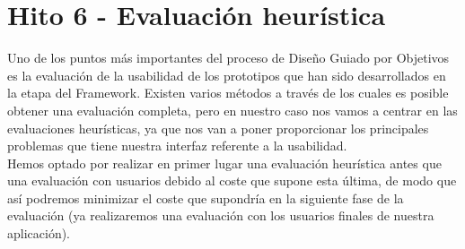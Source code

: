 \chapter{Hito 6 - Evaluación heurística}
Uno de los puntos más importantes del proceso de Diseño Guiado por Objetivos es la evaluación de la usabilidad de los
prototipos que han sido desarrollados en la etapa del Framework. Existen varios métodos a través de los cuales es posible
obtener una evaluación completa, pero en nuestro caso nos vamos a centrar en las evaluaciones heurísticas, ya que nos van a poner
proporcionar los principales problemas que tiene nuestra interfaz referente a la usabilidad. \\

Hemos optado por realizar en primer lugar una evaluación heurística antes que una evaluación con usuarios debido al coste
que supone esta última, de modo que así podremos minimizar el coste que supondría en la siguiente fase de la evaluación (ya realizaremos
una evaluación con los usuarios finales de nuestra aplicación). \\

